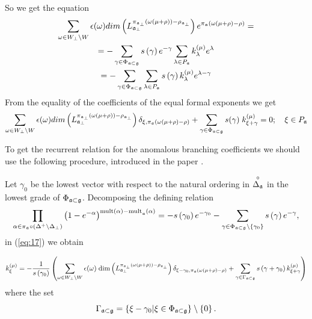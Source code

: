\documentclass[a4paper,12pt]{article}
\theoremstyle{definition} \newtheorem{Def}{Definition}
\begin{document}
So we get the equation
\begin{multline}
  \label{eq:16}
  \sum_{\omega\in W_{\bot}\backslash W} \epsilon(\omega) dim\left(L^{\pi_{\mathfrak{a}_{\bot}}(\omega(\mu+\rho))-\rho_{\mathfrak{a}_{\bot}}}_{\mathfrak{a}_{\bot}}\right) e^{\pi_{\mathfrak{a}}(\omega(\mu+\rho)-\rho)}=\\
  = -\sum_{\gamma \in \Phi _{\frak{a}\subset \frak{g}}} s\left( \gamma \right) e^{-\gamma }\sum_{\lambda \in P_{\frak{a}}}
  k_{\lambda }^{\left( \mu \right) }e^{\lambda } \\
  =-\sum_{\gamma \in \Phi _{\frak{a}\subset \frak{g}}}\sum_{\lambda \in P_{\frak{a}}}s\left( \gamma \right) k_{\lambda }^{\left( \mu \right)}e^{\lambda -\gamma }
\end{multline}
From the equality of the coefficients of the equal formal exponents we get
\begin{equation}
  \label{eq:17}
   \sum_{\omega\in W_{\bot}\backslash W} \epsilon(\omega) dim\left(L^{\pi_{\mathfrak{a}_{\bot}}(\omega(\mu+\rho))-\rho_{\mathfrak{a}_{\bot}}}_{\mathfrak{a}_{\bot}}\right) \delta_{\xi,\pi_{\mathfrak{a}}(\omega(\mu+\rho)-\rho)}+
   \sum_{\gamma \in \Phi _{\frak{a}\subset \frak{g}}} s(\gamma)\; k^{(\mu)}_{\xi+\gamma}=0;\quad \xi\in P_{\mathfrak{a}}
\end{equation}

To get the recurrent relation for the anomalous branching coefficients we should use the following procedure, introduced in the paper \cite{ilyin812pbc}.

Let $\gamma
_{0} $ be the lowest vector with respect to the natural ordering in $%
\overset{\circ }{\Delta _{\frak{a}}}$ in the lowest grade of $\Phi _{\frak{a}\subset \frak{g}}$. Decomposing the defining relation 
\begin{equation}
  \label{eq:18}
  \prod_{\alpha\in \pi_{\mathfrak{a}}\circ (\Delta^{+}\setminus \Delta_{\bot})}\left(
    1-e^{-\alpha }\right) ^{\mathrm{{mult}\left( \alpha \right) -{mult}}_{\frak{a%
      }}\mathrm{\left( \alpha \right) }}=-s\left( \gamma _{0}\right) e^{-\gamma
    _{0}}-\sum_{\gamma \in \Phi _{\frak{a}\subset \frak{g}}\setminus \left\{\gamma_{0}\right\}}s\left( \gamma \right) e^{-\gamma },  
\end{equation}
in (\ref{eq:17}) we obtain

\begin{equation}
  k_{\xi }^{\left( \mu \right) }=
  -\frac{1}{s\left( \gamma _{0}\right) }
  \left(
    \sum_{\omega\in W_{\bot}\backslash W} \epsilon(\omega)\; \mathrm{dim}
    \left(L^{\pi_{\mathfrak{a}_{\bot}}(\omega(\mu+\rho))-\rho_{\mathfrak{a}_{\bot}}}_{\mathfrak{a}_{\bot}}\right)
    \delta_{\xi-\gamma_0,\pi_{\mathfrak{a}}(\omega(\mu+\rho)-\rho)}+
    \sum_{\gamma \in \Gamma _{\frak{a}\subset \frak{g}}} s\left( \gamma +\gamma _{0}\right) k_{\xi+\gamma }^{\left( \mu \right) }
  \right)   
\label{recurrent relation}
\end{equation}
where the set 
\begin{equation}
\Gamma _{\frak{a}\subset \frak{g}}=\left\{ \xi -\gamma _{0}|\xi \in \Phi _{%
\frak{a}\subset \frak{g}}\right\} \setminus \left\{ 0\right\} .
\label{fan-defined}
\end{equation}
\end{document}
